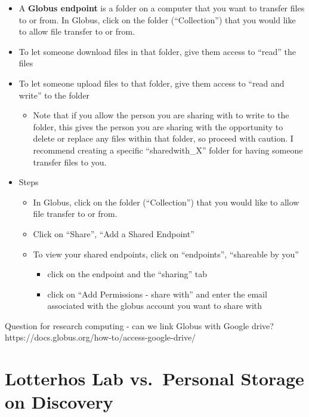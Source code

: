 \documentclass[
  letterpaper,
  DIV=11,
  numbers=noendperiod]{scrreprt}
\providecommand{\tightlist}{%
  \setlength{\itemsep}{0pt}\setlength{\parskip}{0pt}}\usepackage{longtable,booktabs,array}
\begin{document}
\begin{itemize}
\item
  A \textbf{Globus endpoint} is a folder on a computer that you want to
  transfer files to or from. In Globus, click on the folder
  (``Collection'') that you would like to allow file transfer to or
  from.
\item
  To let someone download files in that folder, give them access to
  ``read'' the files
\item
  To let someone upload files to that folder, give them access to ``read
  and write'' to the folder

  \begin{itemize}
  \tightlist
  \item
    Note that if you allow the person you are sharing with to write to
    the folder, this gives the person you are sharing with the
    opportunity to delete or replace any files within that folder, so
    proceed with caution. I recommend creating a specific
    ``sharedwith\_X'' folder for having someone transfer files to you.
  \end{itemize}
\item
  Steps

  \begin{itemize}
  \item
    In Globus, click on the folder (``Collection'') that you would like
    to allow file transfer to or from.
  \item
    Click on ``Share'', ``Add a Shared Endpoint''
  \item
    To view your shared endpoints, click on ``endpoints'', ``shareable
    by you''

    \begin{itemize}
    \item
      click on the endpoint and the ``sharing'' tab
    \item
      click on ``Add Permissions - share with'' and enter the email
      associated with the globus account you want to share with
    \end{itemize}
  \end{itemize}
\end{itemize}

Question for research computing - can we link Globus with Google drive?
https://docs.globus.org/how-to/access-google-drive/

\hypertarget{lotterhos-lab-vs.-personal-storage-on-discovery}{%
\chapter{Lotterhos Lab vs.~Personal Storage on
Discovery}\label{lotterhos-lab-vs.-personal-storage-on-discovery}}
\end{document}
